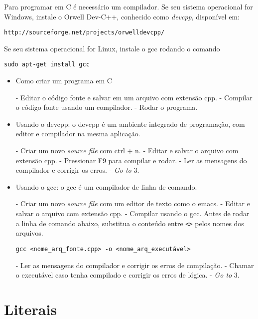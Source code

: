 \documentclass{book}
\begin{document}
Para programar em C é necessário um compilador. Se seu sistema operacional for Windows, instale o Orwell Dev-C++, conhecido como {\it devcpp}, disponível em:

{\tt http://sourceforge.net/projects/orwelldevcpp/}

Se seu sistema operacional for Linux, instale o gcc rodando o comando

{\tt sudo apt-get install gcc}

\begin{itemize}

\item Como criar um programa em C

 - Editar o código fonte e salvar em um arquivo com extensão cpp.
 - Compilar o código fonte usando um compilador.
 - Rodar o programa.

\item Usando o devcpp: o devcpp é um ambiente integrado de programação, com editor e compilador na mesma aplicação.

 - Criar um novo {\it source file} com ctrl + n.
 - Editar e salvar o arquivo com extensão cpp.
 - Pressionar F9 para compilar e rodar.
 - Ler as mensagens do compilador e corrigir os erros.
 - {\it Go to} 3.

\item Usando o gcc: o gcc é um compilador de linha de comando.

 - Criar um novo {\it source file} com um editor de texto como o emacs.
 - Editar e salvar o arquivo com extensão cpp.
 - Compilar usando o gcc. Antes de rodar a linha de comando abaixo, substitua o conteúdo entre {\tt <>} pelos nomes dos arquivos.

{\tt gcc <nome\_arq\_fonte.cpp> -o <nome\_arq\_executável>}

 - Ler as mensagens do compilador e corrigir os erros de compilação.
 - Chamar o executável caso tenha compilado e corrigir os erros de lógica.
 - {\it Go to} 3.

\end{itemize}



\section{Literais}
\label{sec:lit}
\end{document}
